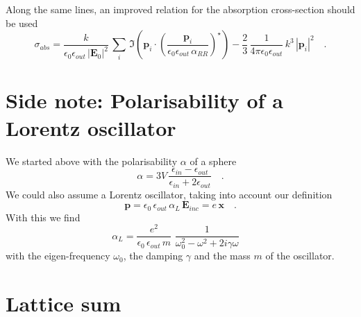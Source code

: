 Along the same lines, an improved relation for the absorption cross-section should be used
 \begin{equation}
\sigma_{abs} = \frac{k}{\epsilon_0 \epsilon_{out}  \, |\mathbf{E}_{0}|^2} \, \sum_i \, \Im \left( \mathbf{p}_i \cdot \left( \frac{\mathbf{p}_i}{\epsilon_0 \epsilon_{out}  \, \alpha_{RR}} \right) ^\star \right) 
- \frac{2}{3} \, \frac{1}{4 \pi \epsilon_0 \epsilon_{out}} \,  k^3 \, |  \mathbf{p}_i |^2 \quad .
\end{equation}


\section{Side note: Polarisability of  a Lorentz oscillator}

We started above with the polarisability $\alpha$ of a sphere
\begin{equation}
 \alpha = 3V \, \frac{\epsilon_{in} - \epsilon_{out}}{\epsilon_{in} + 2 \epsilon_{out}} \quad .
\end{equation}
We could also assume a Lorentz oscillator, taking into account our definition 
 \begin{equation}
\mathbf{p} = \epsilon_0 \, \epsilon_{out} \, \alpha_L \, \mathbf{E}_{inc} = e \, \mathbf{x} \quad .
\end{equation}
With this we find 
 \begin{equation}
 \alpha_L = \frac{e^2 }{ \epsilon_0 \, \epsilon_{out}  \, m} \,  \, \frac{1}{\omega_0^2 - \omega^2 +2  i \gamma \omega }  \quad 
\end{equation}
with the eigen-frequency $\omega_0$, the damping $\gamma$ and the mass $m$ of the oscillator.

\section{Lattice sum}

